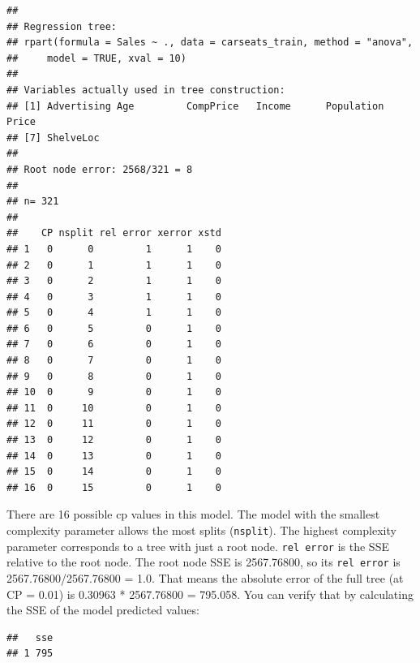 \documentclass[
]{book}
\newenvironment{Shaded}{\begin{snugshade}}{\end{snugshade}}
\newcommand{\DataTypeTok}[1]{\textcolor[rgb]{0.13,0.29,0.53}{#1}}
\newcommand{\DecValTok}[1]{\textcolor[rgb]{0.00,0.00,0.81}{#1}}
\newcommand{\KeywordTok}[1]{\textcolor[rgb]{0.13,0.29,0.53}{\textbf{#1}}}
\newcommand{\NormalTok}[1]{#1}
\newcommand{\OperatorTok}[1]{\textcolor[rgb]{0.81,0.36,0.00}{\textbf{#1}}}
\newcommand{\StringTok}[1]{\textcolor[rgb]{0.31,0.60,0.02}{#1}}
\begin{document}
\begin{verbatim}
## 
## Regression tree:
## rpart(formula = Sales ~ ., data = carseats_train, method = "anova", 
##     model = TRUE, xval = 10)
## 
## Variables actually used in tree construction:
## [1] Advertising Age         CompPrice   Income      Population  Price      
## [7] ShelveLoc  
## 
## Root node error: 2568/321 = 8
## 
## n= 321 
## 
##    CP nsplit rel error xerror xstd
## 1   0      0         1      1    0
## 2   0      1         1      1    0
## 3   0      2         1      1    0
## 4   0      3         1      1    0
## 5   0      4         1      1    0
## 6   0      5         0      1    0
## 7   0      6         0      1    0
## 8   0      7         0      1    0
## 9   0      8         0      1    0
## 10  0      9         0      1    0
## 11  0     10         0      1    0
## 12  0     11         0      1    0
## 13  0     12         0      1    0
## 14  0     13         0      1    0
## 15  0     14         0      1    0
## 16  0     15         0      1    0
\end{verbatim}

There are 16 possible cp values in this model. The model with the smallest complexity parameter allows the most splits (\texttt{nsplit}). The highest complexity parameter corresponds to a tree with just a root node. \texttt{rel\ error} is the SSE relative to the root node. The root node SSE is 2567.76800, so its \texttt{rel\ error} is 2567.76800/2567.76800 = 1.0. That means the absolute error of the full tree (at CP = 0.01) is 0.30963 * 2567.76800 = 795.058. You can verify that by calculating the SSE of the model predicted values:

\begin{Shaded}
\end{Shaded}

\begin{verbatim}
##   sse
## 1 795
\end{verbatim}
\end{document}
